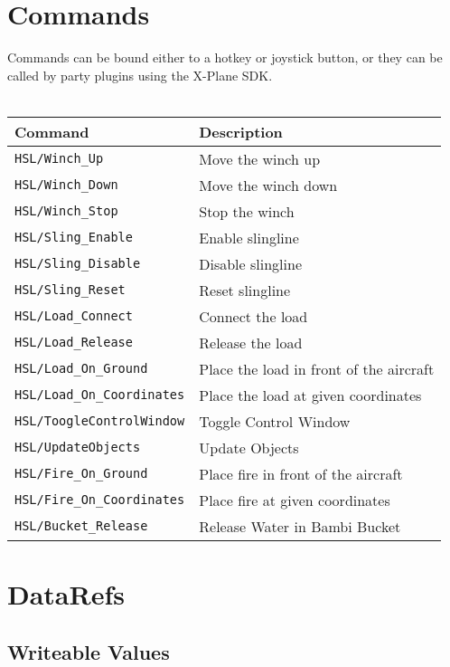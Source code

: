 \documentclass[10pt,a4]{scrartcl}
\begin{document}
\section{Commands}

Commands can be bound either to a hotkey or joystick button, or they can be called by  party plugins using the X-Plane SDK.\\
\\
\begin{tabular}{| l | l |} \hline
\textbf{Command} & \textbf{Description}\\ \hline
\texttt{HSL/Winch\_Up} & Move the winch up\\ \hline
\texttt{HSL/Winch\_Down} & Move the winch down\\ \hline
\texttt{HSL/Winch\_Stop} & Stop the winch\\ \hline
\texttt{HSL/Sling\_Enable} & Enable slingline\\ \hline
\texttt{HSL/Sling\_Disable} & Disable slingline\\ \hline
\texttt{HSL/Sling\_Reset} & Reset slingline\\ \hline
\texttt{HSL/Load\_Connect} & Connect the load\\ \hline
\texttt{HSL/Load\_Release} & Release the load\\ \hline
\texttt{HSL/Load\_On\_Ground} & Place the load in front of the aircraft\\ \hline
\texttt{HSL/Load\_On\_Coordinates} & Place the load at given coordinates\\ \hline
\texttt{HSL/ToogleControlWindow} & Toggle Control Window\\ \hline
\texttt{HSL/UpdateObjects} & Update Objects\\ \hline
\texttt{HSL/Fire\_On\_Ground} & Place fire in front of the aircraft\\ \hline
\texttt{HSL/Fire\_On\_Coordinates} & Place fire at given coordinates\\ \hline
\texttt{HSL/Bucket\_Release} & Release Water in Bambi Bucket\\ \hline
\end{tabular}

\section{DataRefs}


\subsection{Writeable Values}
\end{document}
